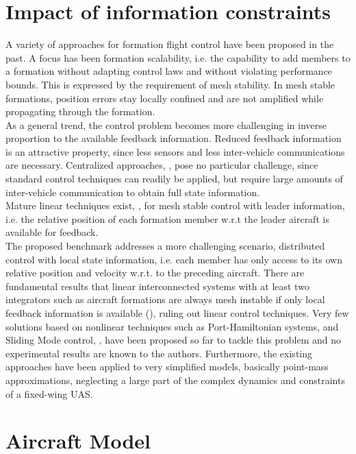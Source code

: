 \documentclass{ifacconf}
\begin{document}
\section{Impact of information constraints}
\label{sec:infoconstr}
A variety of approaches for formation flight control have been proposed in the past. A focus has been formation scalability, i.e. the capability to add members to a formation without adapting control laws and without violating performance bounds. This is expressed by the requirement of mesh stability. In mesh stable formations, position errors stay locally confined and are not amplified while propagating through the formation.\\
As a general trend, the control problem becomes more challenging in inverse proportion to the available feedback information. Reduced feedback information is an attractive property, since less sensors and less inter-vehicle communications are necessary.
Centralized approaches, \cite{nageli2014environment}, pose no particular challenge, since standard control techniques can readily be applied, but require large amounts of inter-vehicle communication to obtain full state information.\\
Mature linear techniques exist, \cite{shaw2007controller}, for mesh stable control with leader information, i.e. the relative position of each formation member w.r.t the leader aircraft is available for feedback.\\
The proposed benchmark addresses a more challenging scenario, distributed control with local state information, i.e. each member has only access to its own relative position and velocity w.r.t. to the preceding aircraft. 
There are fundamental results that linear interconnected systems with at least two integrators such as aircraft formations are always mesh instable if only local feedback information is available (\cite{Pant2001}), ruling out linear control techniques.
Very few solutions based on nonlinear techniques such as Port-Hamiltonian systems, \cite{Knorn2014} and Sliding Mode control, \cite{galzi2006uav,Bolting2016}, have been proposed so far to tackle this problem and no experimental results are known to the authors. Furthermore, the existing approaches have been applied to very simplified models, basically point-mass approximations, neglecting a large part of the complex dynamics and constraints of a fixed-wing UAS. 

\section{Aircraft Model}
\label{sec:model}
\end{document}
